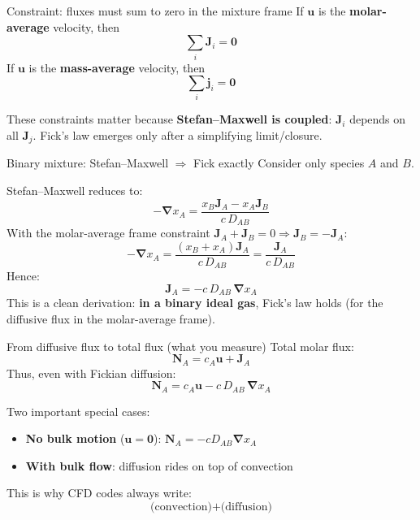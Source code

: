 \documentclass[aspectratio=169]{beamer}
\newcommand{\grad}{\bm{\nabla}}
\newcommand{\J}{\bm{J}}
\newcommand{\N}{\bm{N}}
\newcommand{\jvec}{\bm{j}}
\newcommand{\uvec}{\bm{u}}
\begin{document}
\begin{frame}{Constraint: fluxes must sum to zero in the mixture frame}
If $\uvec$ is the \textbf{molar-average} velocity, then
\[
\sum_i \J_i = \bm{0}
\]
If $\uvec$ is the \textbf{mass-average} velocity, then
\[
\sum_i \jvec_i = \bm{0}
\]

These constraints matter because \textbf{Stefan--Maxwell is coupled}: $\J_i$ depends on all $\J_j$.
Fick’s law emerges only after a simplifying limit/closure.
\end{frame}

\begin{frame}{Binary mixture: Stefan--Maxwell $\Rightarrow$ Fick exactly}
Consider only species $A$ and $B$.

Stefan--Maxwell reduces to:
\[
-\grad x_A = \frac{x_B \J_A - x_A \J_B}{c\,D_{AB}}
\]
With the molar-average frame constraint $\J_A+\J_B=0 \Rightarrow \J_B=-\J_A$:
\[
-\grad x_A = \frac{(x_B+x_A)\J_A}{c\,D_{AB}} = \frac{\J_A}{c\,D_{AB}}
\]
Hence:
\[
\boxed{\J_A = -c\,D_{AB}\,\grad x_A}
\]
This is a clean derivation: \textbf{in a binary ideal gas}, Fick’s law holds (for the diffusive flux in the molar-average frame).
\end{frame}

\begin{frame}{From diffusive flux to total flux (what you measure)}
Total molar flux:
\[
\N_A = c_A \uvec + \J_A
\]
Thus, even with Fickian diffusion:
\[
\boxed{\N_A = c_A \uvec - c\,D_{AB}\,\grad x_A}
\]

Two important special cases:
\begin{itemize}
  \item \textbf{No bulk motion} ($\uvec=\bm{0}$): $\N_A = -cD_{AB}\grad x_A$
  \item \textbf{With bulk flow}: diffusion rides on top of convection
\end{itemize}

This is why CFD codes always write:
\[
\text{(convection)} + \text{(diffusion)}
\]
\end{frame}
\end{document}
